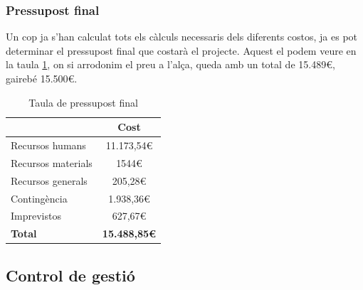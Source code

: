 \documentclass[a4paper]{article}
\begin{document}
\subsubsection{Pressupost final}

Un cop ja s'han calculat tots els càlculs necessaris dels diferents costos, ja es pot determinar el pressupost final que costarà el projecte. Aquest el podem veure en la taula \ref{tab:TaulaFinal}, on si arrodonim el preu a l'alça, queda amb un total de 15.489€, gairebé 15.500€.

\begin{table}[H]
    \begin{center}
        \begin{tabular}{|l|c|}
            \hline
            \rowcolor[HTML]{9B9B9B} 
            {\color[HTML]{000000} \textbf{}}          & {\color[HTML]{000000} \textbf{Cost}}       \\ \hline
            {\color[HTML]{000000} Recursos humans}    & {\color[HTML]{000000} 11.173,54€}          \\ \hline
            {\color[HTML]{000000} Recursos materials} & {\color[HTML]{000000} 1544€}                \\ \hline
            {\color[HTML]{000000} Recursos generals}  & {\color[HTML]{000000} 205,28€}             \\ \hline
            {\color[HTML]{000000} Contingència}       & {\color[HTML]{000000} 1.938,36€}           \\ \hline
            {\color[HTML]{000000} Imprevistos}        & {\color[HTML]{000000} 627,67€}             \\ \hline
            \rowcolor[HTML]{C0C0C0} 
            {\color[HTML]{000000} \textbf{Total}}     & {\color[HTML]{000000} \textbf{15.488,85€}} \\ \hline
        \end{tabular}
        \caption{Taula de pressupost final}
        \label{tab:TaulaFinal}
    \end{center}
\end{table}

\subsection{Control de gestió}
\end{document}
